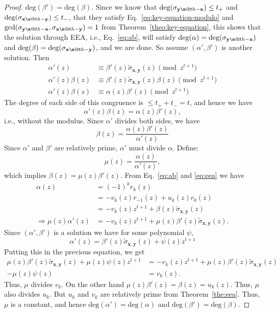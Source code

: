 \documentclass[pdflatex,sn-mathphys-num]{sn-jnl}
\makeatletter
\newcommand{\dotdiv}{\mathbin{\text{\@dotdiv}}}
\newcommand{\@dotdiv}{%
  \ooalign{\hidewidth\raise1ex\hbox{.}\hidewidth\cr$\m@th-$\cr}%
}
\theoremstyle{definition}
\newcommand{\vtr}[1]{\mathbf{#1}}
\makeatother
\begin{document}
\begin{proof}
$\text{deg}(\beta') = \text{deg}(\beta)$. Since we know that $\text{deg}(\sigma_{\vtr{y} \dotdiv \vtr{x}}) \leq t_+$
 and $\text{deg}(\sigma_{\vtr{x} \dotdiv \vtr{y}}) \leq t_-$, that they satisfy Eq.~\eqref{eq:key-equation-modulo} and $\gcd(\sigma_{\vtr{y} \dotdiv \vtr{x}}, \sigma_{\vtr{x} \dotdiv \vtr{y}}) = 1$ from Theorem~\ref{theo:key-equation}, this shows that the solution through EEA, i.e., Eq.~\eqref{eq:ab}, will satisfy $\text{deg}(\alpha) = \text{deg}(\sigma_{\vtr{y} \dotdiv \vtr{x}})$ and $\text{deg}(\beta) = \text{deg}(\sigma_{\vtr{x} \dotdiv \vtr{y}})$, and we are done. So assume $(\alpha', \beta')$ is another solution. Then
\begin{align}
 \alpha'(z) &\equiv \beta'(z) \tilde{\sigma}_{\vtr{x}, \vtr{y}}(z) \pmod{z^{t+1}} \label{eq:ab-congruence} \\
    \alpha'(z) \beta(z) &\equiv \beta'(z)  \tilde{\sigma}_{\vtr{x}, \vtr{y}}(z) \beta(z) \pmod{z^{t+1}} \nonumber\\
    \alpha'(z) \beta(z) &\equiv \alpha(z) \beta'(z) \pmod{z^{t+1}} \nonumber
\end{align}
The degree of each side of this congruence is $\leq t_+ + t_- = t$, and hence we have 
\[
\alpha'(z) \beta(z) = \alpha(z) \beta'(z),
\]
i.e., without the modulus. Since $\alpha'$ divides both sides, we have
\[
\beta(z) = \frac{\alpha(z) \beta'(z)}{\alpha'(z)}
\]
Since $\alpha'$ and $\beta'$ are relatively prime, $\alpha'$ must divide $\alpha$.
Define:
\[
\mu(z) = \frac{\alpha(z)}{\alpha'(z)},
\]
which implies ${\beta(z)} = \mu(z) {\beta'(z)}$. From Eq.~\eqref{eq:ab} and \eqref{eq:eea} we have
\begin{align*}
    \alpha(z) &= (-1)^k r_k(z) \\
            &= -v_k(z)r_{-1}(z) + u_k(z) r_0(z) \\
            &= -v_k(z) z^{t+1} + \beta(z) \tilde{\sigma}_{\vtr{x}, \vtr{y}}(z)\\
\Rightarrow \mu(z) \alpha'(z) &= -v_k(z) z^{t+1} + \mu(z) \beta'(z) \tilde{\sigma}_{\vtr{x}, \vtr{y}}(z).
\end{align*} 
Since $(\alpha', \beta')$ is a solution we have for some polynomial $\psi$, 
\[
\alpha'(z) = \beta'(z) \tilde{\sigma}_{\vtr{x}, \vtr{y}}(z) + \psi(z) z^{t+1}
\]
Putting this in the previous equation, we get
\begin{align*}
\mu(z) \beta'(z) \tilde{\sigma}_{\vtr{x}, \vtr{y}}(z) + \mu(z) \psi(z) z^{t+1} &= -v_k(z) z^{t+1} + \mu(z) \beta'(z) \tilde{\sigma}_{\vtr{x}, \vtr{y}}(z) \\
-\mu(z) \psi(z) &= v_k(z).
\end{align*}
Thus, $\mu$ divides $v_k$. On the other hand $\mu(z) \beta'(z) = \beta(z) = u_k(z)$. Thus, $\mu$ also divides $u_k$. But $u_k$ and $v_k$ are relatively prime from Theorem~\ref{the:eea}. Thus, $\mu$ is a constant, and hence $\text{deg}(\alpha') = \text{deg}(\alpha)$ and $\text{deg}(\beta') = \text{deg}(\beta)$. 


\end{proof}
\end{document}
